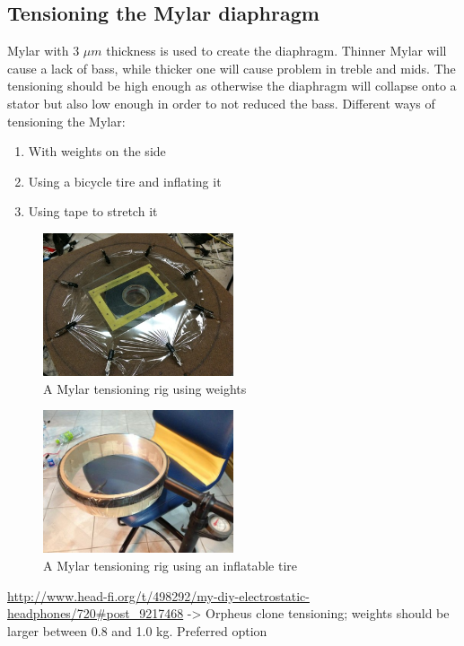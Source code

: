 \documentclass{article}
\begin{document}
\subsection{Tensioning the Mylar diaphragm}
\label{s:driver:tension}
Mylar with 3 $\mu m$ thickness is used to create the diaphragm. Thinner Mylar will cause a lack of bass, while thicker one will cause problem in treble and mids. The tensioning should be high enough as otherwise the diaphragm will collapse onto a stator but also low enough in order to not reduced the bass.
Different ways of tensioning the Mylar:
\begin{enumerate}
    \item With weights on the side
    \item Using a bicycle tire and inflating it
    \item Using tape to stretch it
\end{enumerate}
\begin{figure}[htb]
    \centering
    \includegraphics[width=0.5\textwidth]{images/mylar-tension-weight.png}
    \caption{A Mylar tensioning rig using weights}
    \label{f:driver:tension:weight}
\end{figure}
\begin{figure}[htb]
    \centering
    \includegraphics[width=0.5\textwidth]{images/mylar-tension-tire.png}
    \caption{A Mylar tensioning rig using an inflatable tire}
    \label{f:driver:tension:tire}
\end{figure}
\url{http://www.head-fi.org/t/498292/my-diy-electrostatic-headphones/720#post_9217468} -> Orpheus clone tensioning; weights should be larger between 0.8 and 1.0 kg. Preferred option
\end{document}
